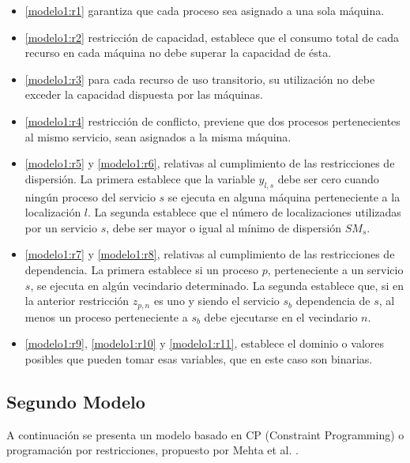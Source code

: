 \begin{itemize}
	\item \eqref{modelo1:r1} garantiza que cada proceso sea asignado a una sola máquina.
	\item \eqref{modelo1:r2} restricción de capacidad, establece que el consumo total de cada recurso en cada máquina no debe superar la capacidad de ésta.
	\item \eqref{modelo1:r3} para cada recurso de uso transitorio, su utilización no debe exceder la capacidad dispuesta por las máquinas.
	\item \eqref{modelo1:r4} restricción de conflicto, previene que dos procesos pertenecientes al mismo servicio, sean asignados a la misma máquina.
	\item \eqref{modelo1:r5} y \eqref{modelo1:r6}, relativas al cumplimiento de las restricciones de dispersión. La primera establece que la variable $y_{l,s}$ debe ser cero cuando ningún proceso del servicio $s$ se ejecuta en alguna máquina perteneciente a la localización $l$. La segunda establece que el número de localizaciones utilizadas por un servicio $s$, debe ser mayor o igual al mínimo de dispersión $SM_s$.
	\item \eqref{modelo1:r7} y \eqref{modelo1:r8}, relativas al cumplimiento de las restricciones de dependencia. La primera establece si un proceso $p$, perteneciente a un servicio $s$, se ejecuta en algún vecindario determinado. La segunda establece que, si en la anterior restricción $z_{p,n}$ es uno y siendo el servicio $s_b$ dependencia de $s$, al menos un proceso perteneciente a $s_b$ debe ejecutarse en el vecindario $n$.  
	\item \eqref{modelo1:r9}, \eqref{modelo1:r10} y \eqref{modelo1:r11}, establece el dominio o valores posibles que pueden tomar esas variables, que en este caso son binarias.
\end{itemize}

\subsection{Segundo Modelo}
A continuación se presenta un modelo basado en CP (Constraint Programming) o programación por restricciones, propuesto por Mehta et al. \cite{mehta2012comparing}. 

